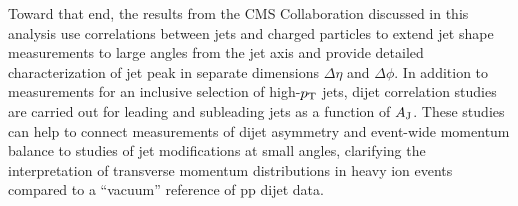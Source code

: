 Toward that end, the results from the CMS Collaboration discussed in this analysis use correlations between jets and charged particles to extend jet shape measurements to large angles from the jet axis and provide detailed characterization of jet peak in separate dimensions $\Delta\eta$ and $\Delta\phi$.  In addition to measurements for an inclusive selection of high-$p_{\rm T}$ jets, dijet correlation studies are carried out for leading and subleading jets as a function of $A_{\rm J}$.  These studies can help to connect measurements of dijet asymmetry and event-wide momentum balance to studies of jet modifications at small angles, clarifying the interpretation of transverse momentum distributions in heavy ion events compared to a ``vacuum'' reference of pp dijet data. 
